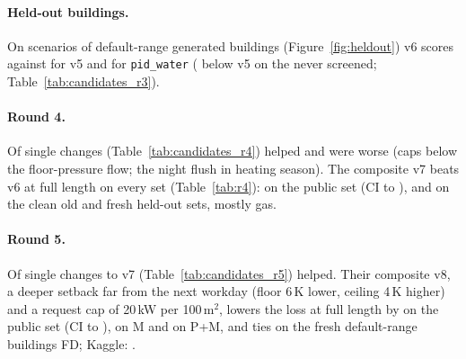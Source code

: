 \documentclass{article}
\begin{document}
\paragraph{Held-out buildings.}
On \NHeldAll{} scenarios of \NHeldAllBuild{} default-range generated buildings (Figure~\ref{fig:heldout}) v6 scores
\HeldAllMetricOurs{} against \HeldAllMetricOursVFive{} for v5 and \HeldAllMetricPidWater{} for \texttt{pid\_water}
(\HeldUnscrVFiveRelRed{} below v5 on the \NHeldUnscr{} never screened; Table~\ref{tab:candidates_r3}).

\paragraph{Round 4.}
Of \RFNSingles{} single changes (Table~\ref{tab:candidates_r4}) \RFNHelps{} helped and \RFNWorse{} were worse (caps
below the floor-pressure flow; the night flush in heating season). The composite v7 beats v6 at full length on every
set (Table~\ref{tab:r4}): \RFConfPubRed{} on the public set (CI \RFConfPubRedLo{} to \RFConfPubRedHi),
\RFConfOldCleanRed{} and \RFConfFreshRed{} on the clean old and fresh held-out sets, mostly gas.

\paragraph{Round 5.}
Of \RFiveNSingles{} single changes to v7 (Table~\ref{tab:candidates_r5}) \RFiveNHelps{} helped. Their composite v8, a
deeper setback far from the next workday (floor 6\,K lower, ceiling 4\,K higher) and a request cap of 20\,kW per
100\,m$^2$, lowers the loss at full length by
\RFiveConfPubRelAbs{} on the public set (CI \RFiveConfPubRelHiAbs{} to \RFiveConfPubRelLoAbs), \RFiveConfMinnRelAbs{} on
M and \RFiveConfPubMinnRelAbs{} on P+M, and ties on the fresh default-range buildings FD; Kaggle: \RFiveKagVEight.
\end{document}
